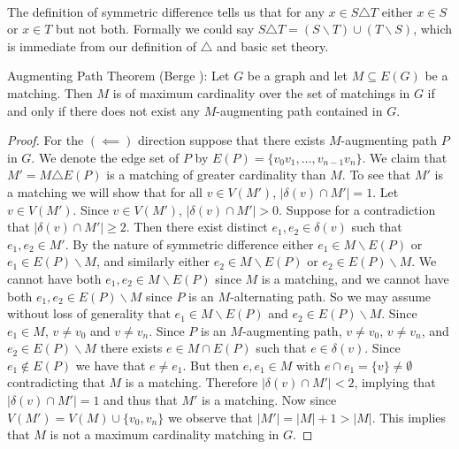 \paragraph{}
The definition of symmetric difference tells us that for any $x \in S \triangle T$ either $x \in S$ or $x \in T$ but not both. Formally we could say $S \triangle T = (S \backslash T) \cup (T \backslash S)$, which is immediate from our definition of $\triangle$ and basic set theory.
\begin{theorem} Augmenting Path Theorem (Berge \cite{berge1957two}): Let $G$ be a graph and let $M \subseteq E(G)$ be a matching. Then $M$ is of maximum cardinality over the set of matchings in $G$ if and only if there does not exist any $M$-augmenting path contained in $G$.
\end{theorem}
\begin{proof}For the $(\impliedby)$ direction suppose that there exists $M$-augmenting path $P$ in $G$. We denote the edge set of $P$ by $E(P) = \{v_0v_1, \dots, v_{n-1}v_n\}$. We claim that $M' = M \triangle E(P)$ is a matching of greater cardinality than $M$. To see that $M'$ is a matching we will show that for all $v \in V(M')$, $|\delta(v) \cap M'| = 1$. Let $v \in V(M')$. Since $v \in V(M')$, $|\delta(v) \cap M'| > 0$. Suppose for a contradiction that $|\delta(v) \cap M'| \geq 2$. Then there exist distinct $e_1, e_2 \in \delta(v)$ such that $e_1, e_2 \in M'$. By the nature of symmetric difference either $e_1 \in M \backslash E(P)$ or $e_1 \in E(P) \backslash M$, and similarly either $e_2 \in M \backslash E(P)$ or $ e_2 \in E(P)\backslash M$. We cannot have both $e_1, e_2 \in M \backslash E(P)$ since $M$ is a matching, and we cannot have both $e_1, e_2 \in E(P) \backslash M$ since $P$ is an $M$-alternating path. So we may assume without loss of generality that $e_1 \in M \backslash E(P)$ and $e_2 \in E(P) \backslash M$. Since $e_1 \in M$, $v \neq v_0$ and $v \neq v_n$. Since $P$ is an $M$-augmenting path, $v \neq v_0$, $v \neq v_n$, and $e_2 \in E(P) \backslash M$ there exists $e \in M \cap E(P)$ such that $e \in \delta(v)$. Since $e_1 \not\in E(P)$ we have that $e \neq e_1$. But then $e, e_1 \in M$ with $e \cap e_1 = \{v\} \neq \emptyset$ contradicting that $M$ is a matching. Therefore $|\delta(v) \cap M'| < 2$, implying that $|\delta(v) \cap M'| = 1$ and thus that $M'$ is a matching. Now since $V(M') = V(M) \cup \{v_0, v_n\}$ we observe that $|M'| = |M| + 1 > |M|$. This implies that $M$ is not a maximum cardinality matching in $G$.

\end{proof}
